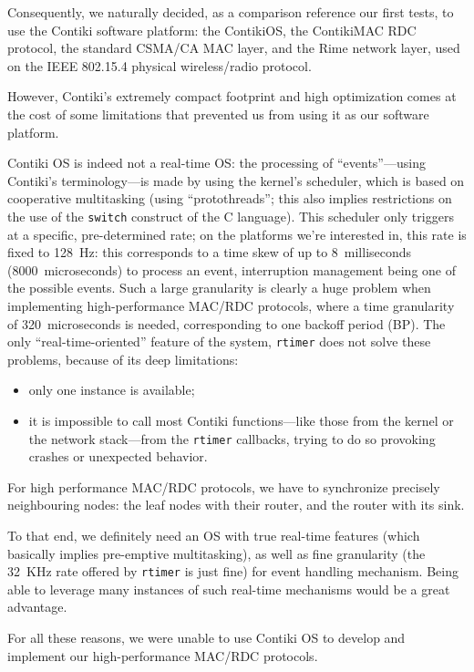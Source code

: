 \documentclass[12pt,a4paper]{article}
\begin{document}
Consequently, we naturally decided, as a comparison reference our first tests,
to use the Contiki software platform: the ContikiOS, the ContikiMAC RDC
protocol, the standard CSMA/CA MAC layer, and the Rime network layer, used
on the IEEE 802.15.4 physical wireless/radio protocol.

\bigskip

However, Contiki's extremely compact footprint and high optimization comes
at the cost of some limitations that prevented us from using it as our
software platform.

Contiki OS is indeed not a real-time OS: the processing of ``events''---using
Contiki's terminology---is made by using the kernel's scheduler, which is
based on cooperative multitasking (using ``protothreads''; this also implies
restrictions on the use of the \texttt{switch} construct of the C language).
This scheduler only triggers at a specific, pre-determined rate; on
the platforms we're interested in, this rate is fixed to 128~Hz:
this corresponds to a time skew of up to 8~milliseconds
(8000~microseconds) to process an event, interruption management being
one of the possible events. Such a large granularity is clearly
a huge problem when implementing high-performance MAC/RDC protocols,
where a time granularity of 320~microseconds is needed, corresponding
to one backoff period (BP). The only ``real-time-oriented'' feature
of the system, \texttt{rtimer} does not solve these problems, because
of its deep limitations:
\begin{itemize}
\item only one instance is available;
\item it is impossible to call most Contiki functions---like those from
the kernel or the network stack---from the \texttt{rtimer} callbacks,
trying to do so provoking crashes or unexpected behavior.
\end{itemize}

\begin{observ}
For high performance MAC/RDC protocols, we have to synchronize precisely
neighbouring nodes: the leaf nodes with their router, and the router
with its sink.

To that end, we definitely need an OS with true real-time features
(which basically implies pre-emptive multitasking), as well as fine
granularity (the 32~KHz rate offered by \texttt{rtimer} is just fine)
for event handling mechanism. Being able to leverage many instances
of such real-time mechanisms would be a great advantage.

For all these reasons, we were unable to use Contiki OS to develop and
implement our high-performance MAC/RDC protocols.
\end{observ}
\end{document}
